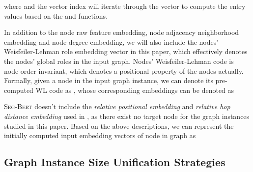 \documentclass{article}
\newcommand{\our}{\textsc{Seg-Bert}}
\begin{document}
where  and the vector index  will iterate through the vector to compute the entry values based on the  and  functions.


In addition to the node raw feature embedding, node adjacency neighborhood embedding and node degree embedding, we will also include the nodes' Weisfeiler-Lehman role embedding vector in this paper, which effectively denotes the nodes' global roles in the input graph. Nodes' Weisfeiler-Lehman code is node-order-invariant, which denotes a positional property of the nodes actually. Formally, given a node  in the input graph instance, we can denote its pre-computed WL code as , whose corresponding embeddings can be denoted as


{\our} doesn't include the \textit{relative positional embedding} and \textit{relative hop distance embedding} used in \cite{zhang2020graph}, as there exist no target node for the graph instances studied in this paper. Based on the above descriptions, we can represent the initially computed input embedding vectors of node  in graph  as 




\subsection{Graph Instance Size Unification Strategies}
\end{document}
